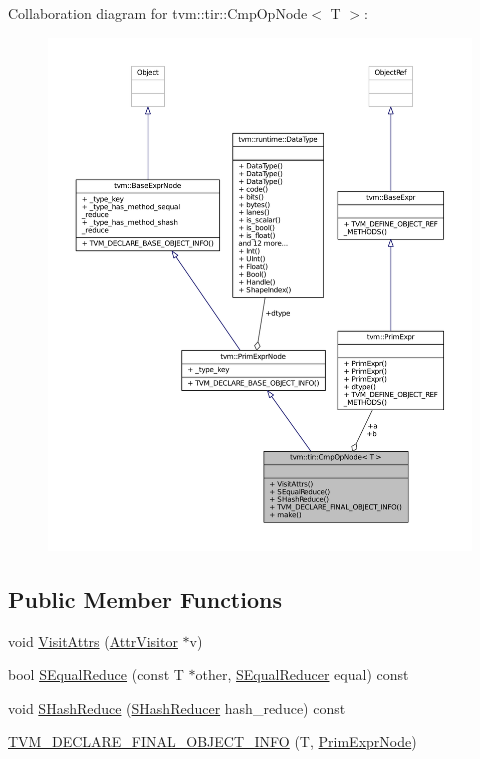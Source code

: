 Collaboration diagram for tvm\+:\+:tir\+:\+:Cmp\+Op\+Node$<$ T $>$\+:
\nopagebreak
\begin{figure}[H]
\begin{center}
\leavevmode
\includegraphics[width=350pt]{classtvm_1_1tir_1_1CmpOpNode__coll__graph}
\end{center}
\end{figure}
\subsection*{Public Member Functions}
\begin{DoxyCompactItemize}
\item 
void \hyperlink{classtvm_1_1tir_1_1CmpOpNode_a309433c1b828b526c8519b17e5a4f13e}{Visit\+Attrs} (\hyperlink{classtvm_1_1AttrVisitor}{Attr\+Visitor} $\ast$v)
\item 
bool \hyperlink{classtvm_1_1tir_1_1CmpOpNode_ac42ac503c690864a31a962727bd252bb}{S\+Equal\+Reduce} (const T $\ast$other, \hyperlink{classtvm_1_1SEqualReducer}{S\+Equal\+Reducer} equal) const 
\item 
void \hyperlink{classtvm_1_1tir_1_1CmpOpNode_a74f4e3c8db9dc74edb56d12200c79f6d}{S\+Hash\+Reduce} (\hyperlink{classtvm_1_1SHashReducer}{S\+Hash\+Reducer} hash\+\_\+reduce) const 
\item 
\hyperlink{classtvm_1_1tir_1_1CmpOpNode_a93297187fc099a6944feba084decf9a7}{T\+V\+M\+\_\+\+D\+E\+C\+L\+A\+R\+E\+\_\+\+F\+I\+N\+A\+L\+\_\+\+O\+B\+J\+E\+C\+T\+\_\+\+I\+N\+FO} (T, \hyperlink{classtvm_1_1PrimExprNode}{Prim\+Expr\+Node})
\end{DoxyCompactItemize}
